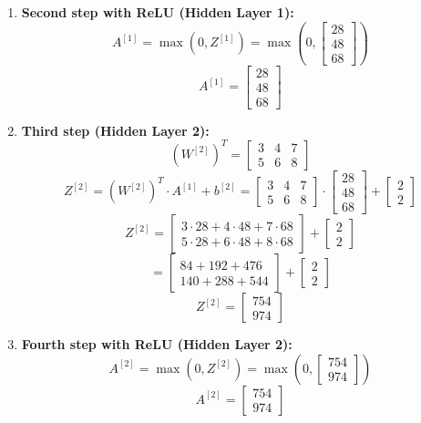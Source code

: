 \documentclass[a4paper,12pt]{article}
\begin{document}
\begin{enumerate}
    \item \textbf{Second step with ReLU (Hidden Layer 1):}
    \[
    A^{[1]} = \max(0, Z^{[1]}) = \max\left(0, \begin{bmatrix} 28 \\ 48 \\ 68 \end{bmatrix}\right)
    \]
    \[
    A^{[1]} = \begin{bmatrix} 28 \\ 48 \\ 68 \end{bmatrix}
    \]

    \item \textbf{Third step (Hidden Layer 2):}
    \[
    (W^{[2]})^T = \begin{bmatrix}
    3 & 4 & 7 \\
    5 & 6 & 8
    \end{bmatrix}
    \]
    \[
    Z^{[2]} = (W^{[2]})^T \cdot A^{[1]} + b^{[2]} = \begin{bmatrix}
    3 & 4 & 7 \\
    5 & 6 & 8
    \end{bmatrix} \cdot \begin{bmatrix} 28 \\ 48 \\ 68 \end{bmatrix} + \begin{bmatrix} 2 \\ 2 \end{bmatrix}
    \]
    \[
    Z^{[2]} = \begin{bmatrix}
    3 \cdot 28 + 4 \cdot 48 + 7 \cdot 68 \\
    5 \cdot 28 + 6 \cdot 48 + 8 \cdot 68
    \end{bmatrix} + \begin{bmatrix} 2 \\ 2 \end{bmatrix}
    \]
    \[
    = \begin{bmatrix} 84 + 192 + 476 \\ 140 + 288 + 544 \end{bmatrix} + \begin{bmatrix} 2 \\ 2 \end{bmatrix}
    \]
    \[
    Z^{[2]} = \begin{bmatrix} 754 \\ 974 \end{bmatrix}
    \]

    \item \textbf{Fourth step with ReLU (Hidden Layer 2):}
    \[
    A^{[2]} = \max(0, Z^{[2]}) = \max\left(0, \begin{bmatrix} 754 \\ 974 \end{bmatrix}\right)
    \]
    \[
    A^{[2]} = \begin{bmatrix} 754 \\ 974 \end{bmatrix}
    \]


\end{enumerate}
\end{document}
